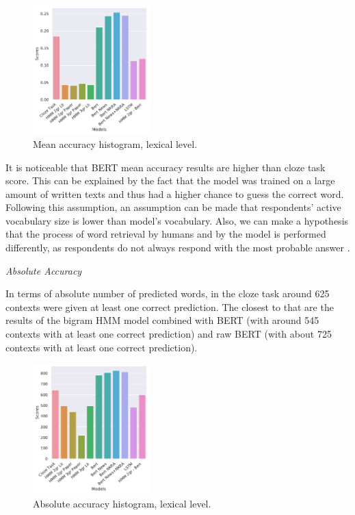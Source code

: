 \documentclass[a4paper]{article}
\newcommand{\head}[1]{\vspace{0.5em}\emph{#1}\vspace{0.25em}}
\begin{document}
\begin{figure}
\caption{Mean accuracy histogram, lexical level.}
\label{fig:mean-accuracy-hist-lex}
\centering
\includegraphics[width=0.4\textwidth]{figures/pdf/mean-accuracy-hist-lex.pdf}
\end{figure}

It is noticeable that BERT mean accuracy results are higher than cloze task score. This can be explained by the fact that the model was trained on a large amount of written texts and thus had a higher chance to guess the correct word. Following this assumption, an assumption can be made that respondents’ active vocabulary size is lower than model’s vocabulary. Also, we can make a hypothesis that the process of word retrieval by humans and by the model is performed differently, as respondents do not always respond with the most probable answer
.

\head{Absolute Accuracy}

In terms of absolute number of predicted words, in the cloze task around 625 contexts were given at least one correct prediction. The closest to that are the results of the bigram HMM model combined with BERT (with around 545 contexts with at least one correct prediction) and raw BERT (with about 725 contexts with at least one correct prediction).

\begin{figure}
\caption{Absolute accuracy histogram, lexical level.}
\label{fig:abs-accuracy-hist-lex}
\centering
\includegraphics[width=0.4\textwidth]{figures/pdf/abs-accuracy-hist-lex.pdf}
\end{figure}
\end{document}
